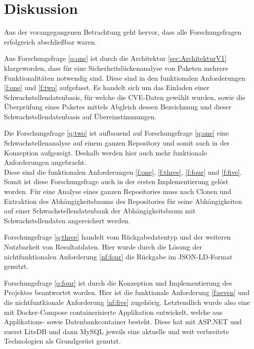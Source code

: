 \section{Diskussion} \label{sec:Diskussion}
    Aus der vorangegangenen Betrachtung geht hervor, dass alle Forschungsfragen erfolgreich abschließbar waren.

    Aus Forschungsfrage \ref{q:one} ist durch die Architektur \ref{sec:ArchitekturV1} klargeworden, dass für eine Sicherheitslückenanalyse von Paketen mehrere Funktionalitäten notwendig sind.
    Diese sind in den funktionalen Anforderungen \ref{f:one} und \ref{f:two} aufgefasst.
    Es handelt sich um das Einladen einer Schwachstellendatenbasis, für welche die \ac{CVE}-Daten gewählt wurden, sowie die Über\-prüfung eines Paketes mittels Abgleich dessen Bezeichnung und dieser Schwachstellendatenbasis auf Über\-ein\-stimmungen.

    Die Forschungsfrage \ref{q:two} ist aufbauend auf Forschungsfrage \ref{q:one} eine Schwachstellenanalyse auf einem ganzen Repository und somit auch in der Konzeption aufgezeigt.
    Deshalb werden hier auch mehr funktionale Anforderungen angebracht.
    \\
    Diese sind die funktionalen Anforderungen \ref{f:one}, \ref{f:three}, \ref{f:four} und \ref{f:five}.
    Somit ist diese Forschungsfrage auch in der ersten Implementierung gelöst worden.
    Für eine Analyse eines ganzen Repositories muss nach Clonen und Extraktion des Abhängigkeitsbaums des Repositories für seine Abhängigkeiten auf einer Schwachstellendatenbank der Abhängigkeitsbaum mit Schwachstellendaten angereichert werden.

    Forschungsfrage \ref{q:three} handelt vom Rückgabedatentyp und der weiteren Nutzbarkeit von Resultatdaten.
    Hier wurde durch die Lösung der nichtfunktionalen Anforderung \ref{nf:four} die Rückgabe im JSON-LD-Format genutzt.

    Forschungsfrage \ref{q:four} ist durch die Konzeption und Implementierung des Projektes beantwortet worden.
    Hier ist die funktionale Anforderung \ref{f:seven} und die nichtfuntkionale Anforderung \ref{nf:five} zugehörig.
    Letztendlich wurde also eine mit Docker-Compose containerisierte Applikation entwickelt, welche aus Applikations- sowie Datenbankcontainer besteht.
    Diese hat mit ASP.NET und zuerst LiteDB und dann MySQL jeweils eine aktuelle und weit verbreitete Technologien als Grundgerüst genutzt.

